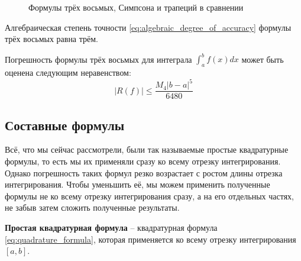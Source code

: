\documentclass[../main.tex]{subfile}
\begin{document}
\begin{figure}[ht]
	\caption*{Формулы трёх восьмых, Симпсона и трапеций в сравнении}
\end{figure}

\begin{lemma}
	Алгебраическая степень точности \eqref{eq:algebraic_degree_of_accuracy}
	формулы трёх восьмых равна трём.
\end{lemma}
\proofexercise

\begin{theorem}
	Погрешность формулы трёх восьмых для интеграла $\int_a^b f(x)dx$ может
	быть оценена следующим неравенством:
	\[\boxed{|R(f)|\le\frac{M_4|b-a|^5}{6480}}\]
\end{theorem}
\proofexercise

\subsection{Составные формулы}
Всё, что мы сейчас рассмотрели, были так называемые простые квадратурные
формулы, то есть мы их применяли сразу ко всему отрезку интегрирования. Однако
погрешность таких формул резко возрастает с ростом длины отрезка интегрирования.
Чтобы уменьшить её, мы можем применить полученные формулы не ко всему отрезку
интегрирования сразу, а на его отдельных частях, не забыв затем сложить
полученные результаты.

\begin{define}
	\textbf{Простая квадратурная формула} -- квадратурная формула
	\eqref{eq:quadrature_formula}, которая применяется ко всему отрезку
	интегрирования $[a,b]$.
\end{define}
\end{document}
